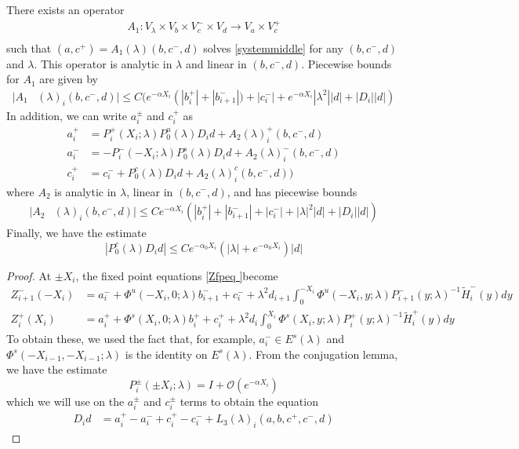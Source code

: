 \documentclass[thesis.tex]{subfiles}
\begin{document}
\begin{lemma}\label{Zinv1}
There exists an operator
\begin{align*}
A_1: V_\lambda \times V_b \times V_c^- \times V_d \rightarrow V_a \times V_c^+\\
\end{align*}
such that $(a, c^+) = A_1(\lambda)(b, c^-,d)$ solves \eqref{systemmiddle} for any $(b, c^-,d)$ and $\lambda$. This operator is analytic in $\lambda$ and linear in $(b,c^-,d)$. Piecewise bounds for $A_1$ are given by
\begin{align}\label{A1bound}
|A_1&(\lambda)_i(b, c^-, d)|
\leq C \Big( e^{-\alpha X_i} \left( |b_i^+| + |b_{i+1}^-|) + |c_i^-| + e^{-\alpha X_i} |\lambda^2||d| + |D_i||d| \right)
\end{align} 
In addition, we can write $a_i^\pm$ and $c_i^+$ as 
\begin{align*}
a_i^+ &= P_i^+(X_i; \lambda) P_0^u(\lambda) D_i d + A_2(\lambda)_i^+(b, c^-, d) \\
a_i^- &= -P_i^-(-X_i; \lambda) P_0^s(\lambda) D_i d + A_2(\lambda)_i^-(b, c^-, d) \\
c_i^+ &= c_i^- + P_0^c(\lambda) D_i d + A_2(\lambda)_i^c(b, c^-, d) )
\end{align*}
where $A_2$ is analytic in $\lambda$, linear in $(b, c^-, d)$, and has piecewise bounds
\begin{align*}
|A_2&(\lambda)_i(b, c^-, d)|
\leq C e^{-\alpha X_i} \left( |b_i^+| + |b_{i+1}^-| + |c_i^-| + |\lambda|^2|d| + |D_i||d| \right)
\end{align*}
Finally, we have the estimate
\begin{equation}\label{P0cDid}
|P_0^c(\lambda) D_i d| \leq C e^{-\alpha_0 X_i}(|\lambda| + e^{-\alpha_0 X_i})|d|
\end{equation}

\begin{proof}
At $\pm X_i$, the fixed point equations \eqref{Zfpeq }become
\begin{align*}
Z_{i+1}^-(-X_i) &= a_i^- + \Phi^u(-X_i, 0; \lambda) b_{i+1}^- + c_i^- 
+ \lambda^2 d_{i+1} \int_0^{-X_i} \Phi^u(-X_i, y; \lambda) P_{i+1}^-(y; \lambda)^{-1} \tilde{H}_i^-(y) dy \\
Z_i^+(X_i) &= a_i^+ + \Phi^s(X_i, 0; \lambda) b_i^+ + c_i^+ 
+ \lambda^2 d_i \int_0^{X_i} \Phi^s(X_i, y; \lambda) P_i^+(y; \lambda)^{-1} \tilde{H}_i^+(y) dy
\end{align*}
To obtain these, we used the fact that, for example, $a_i^- \in E^s(\lambda)$ and $\Phi^s(-X_{i-1}, -X_{i-1}; \lambda)$ is the identity on $E^s(\lambda)$. From the conjugation lemma, we have the estimate
\begin{equation}\label{conjest}
P_i^\pm(\pm X_i; \lambda) = I + \mathcal{O}(e^{-\alpha X_i})
\end{equation}
which we will use on the $a_i^\pm$ and $c_i^\pm$ terms to obtain the equation
\begin{align}\label{Dideq1}
D_i d &= a_i^+ - a_i^- + c_i^+ - c_i^- + L_3(\lambda)_i(a, b, c^+, c^-, d)
\end{align}


\end{proof}
\end{lemma}
\end{document}
